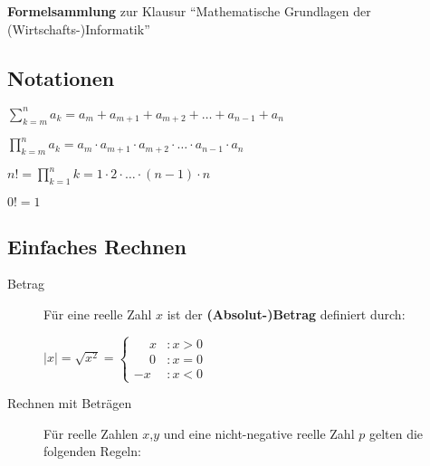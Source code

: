 \documentclass[
  ngerman,
  a4paper,
  landscape, fontsize=9pt, version=first, enabledeprecatedfontcommands,
  DIV=6]{scrartcl}
\date{}
\providecommand{\tightlist}{%
  \setlength{\itemsep}{0pt}\setlength{\parskip}{0pt}}
\begin{document}
%
%
%

{\Huge\sffamily\textcolor{FOMVoll}{{\bfseries Formelsammlung} zur Klausur \enquote{Mathematische Grundlagen der (Wirtschafts-)Informatik}}}

\setlength{\columnsep}{0.75cm}
\begin{multicols}{3}

\hypertarget{notationen}{%
\subsection{Notationen}\label{notationen}}

\begin{description}
\tightlist
\item[Summenzeichen]
\(\displaystyle \sum\limits_{k=m}^n a_k = a_m + a_{m+1} + a_{m+2} + \dotsc + a_{n-1} + a_{n}\)
\item[Produktzeichen]
\(\displaystyle \prod\limits_{k=m}^n a_k = a_m \cdot a_{m+1} \cdot a_{m+2} \cdot \dotsc \cdot a_{n-1} \cdot a_{n}\)
\item[Fakultät]
\(\displaystyle n! = \prod\limits_{k=1}^n k = 1 \cdot 2 \cdot \dotsc \cdot (n-1) \cdot n\)

\(\displaystyle 0! = 1\)
\end{description}

\hypertarget{einfaches-rechnen}{%
\subsection{Einfaches Rechnen}\label{einfaches-rechnen}}

\begin{description}
\item[Betrag]
Für eine reelle Zahl \(x\) ist der \textbf{(Absolut-)Betrag} definiert
durch:

\(\displaystyle |x| = \sqrt{x^2} = \begin{cases} \phantom{-}x &: x > 0 \\ \phantom{-}0 &: x=0 \\ -x &: x <0 \end{cases}\)
\item[Rechnen mit Beträgen]
Für reelle Zahlen \(x\),\(y\) und eine nicht-negative reelle Zahl \(p\)
gelten die folgenden Regeln:


\end{description}
\end{multicols}
\end{document}
